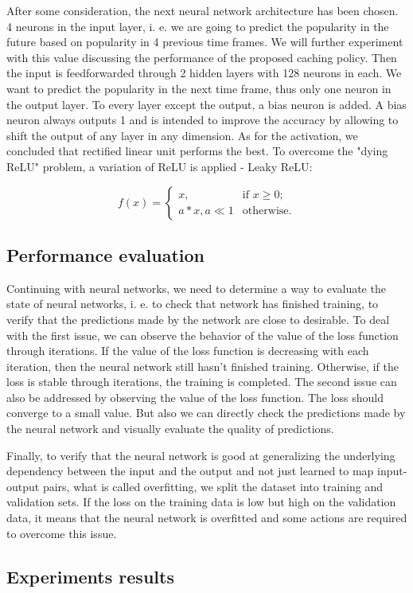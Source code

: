 After some consideration, the next neural network architecture has been chosen. 4 neurons in the input layer, i. e. we are going to predict the popularity in the future based on popularity in 4 previous time frames. We will further experiment with this value discussing the performance of the proposed caching policy. Then the input is feedforwarded through 2 hidden layers with 128 neurons in each. We want to predict the popularity in the next time frame, thus only one neuron in the output layer. To every layer except the output, a bias neuron is added. A bias neuron always outputs 1 and is intended to improve the accuracy by allowing to shift the output of any layer in any dimension. As for the activation, we concluded that rectified linear unit performs the best. To overcome the "dying ReLU"\cite{14} problem, a variation of ReLU is applied - Leaky ReLU:

$$ f(x) = 
	\begin{cases}
	x, & \text{if } x \geq 0; \\
	a*x, a \ll 1 & \text{otherwise.}
	\end{cases}
$$

\subsection{Performance evaluation}

Continuing with neural networks, we need to determine a way to evaluate the state of neural networks, i. e. to check that network has finished training, to verify that the predictions made by the network are close to desirable. To deal with the first issue, we can observe the behavior of the value of the loss function through iterations. If the value of the loss function is decreasing with each iteration, then the neural network still hasn't finished training. Otherwise, if the loss is stable through iterations, the training is completed. The second issue can also be addressed by observing the value of the loss function. The loss should converge to a small value. But also we can directly check the predictions made by the neural network and visually evaluate the quality of predictions.

Finally, to verify that the neural network is good at generalizing the underlying dependency between the input and the output and not just learned to map input-output pairs, what is called overfitting\cite{15}, we split the dataset into training and validation sets. If the loss on the training data is low but high on the validation data, it means that the neural network is overfitted and some actions are required to overcome this issue.

\subsection{Experiments results}

